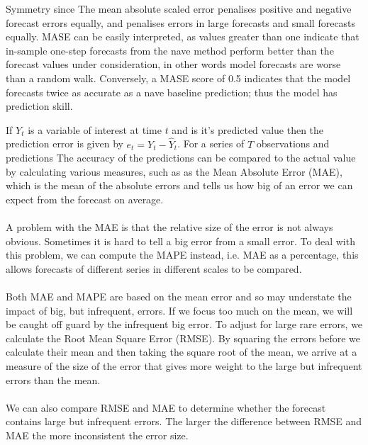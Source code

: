 Symmetry since The mean absolute scaled error penalises positive and negative forecast errors equally, and penalises errors in large forecasts and small forecasts equally. MASE can be easily interpreted, as values greater than one indicate that in-sample one-step forecasts from the nave method perform better than the forecast values under consideration, in other words model forecasts are worse than a random walk. Conversely, a MASE score of 0.5 indicates that the model forecasts twice as accurate as a nave baseline prediction; thus the model has prediction skill.  

\iffalse
If $Y_t$ is a variable of interest at time $t$ and  is it's predicted value then the prediction error is given by $e_t = Y_t - \hat{Y}_t$. For a series of $T$ observations and predictions The accuracy of the predictions can be compared to the actual value by calculating various measures, such as as the Mean Absolute Error (MAE), which is the mean of the absolute errors and tells us how big of an error we can expect from the forecast on average. \\

 \\

A problem with the MAE is that the relative size of the error is not always obvious. Sometimes it is hard to tell a big error from a small error. To deal with this problem, we can compute the MAPE instead, i.e. MAE as a percentage, this allows forecasts of different series in different scales to be compared.\\

\\

Both MAE and MAPE are based on the mean error and so may understate the impact of big, but infrequent, errors. If we focus too much on the mean, we will be caught off guard by the infrequent big error. To adjust for large rare errors, we calculate the Root Mean Square Error (RMSE). By squaring the errors before we calculate their mean and then taking the square root of the mean, we arrive at a measure of the size of the error that gives more weight to the large but infrequent errors than the mean.\\

 \\

We can also compare RMSE and MAE to determine whether the forecast contains large but infrequent errors. The larger the difference between RMSE and MAE the more inconsistent the error size.
 
